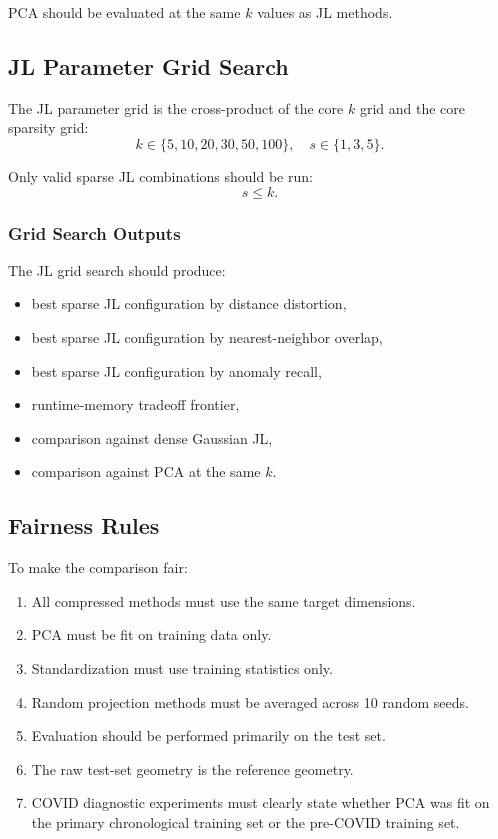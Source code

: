 \documentclass[11pt]{article}
\begin{document}
PCA should be evaluated at the same $k$ values as JL methods.

\subsection{JL Parameter Grid Search}

The JL parameter grid is the cross-product of the core $k$ grid and the core sparsity grid:
\[
k \in \{5, 10, 20, 30, 50, 100\},
\quad
s \in \{1, 3, 5\}.
\]

Only valid sparse JL combinations should be run:
\[
s \leq k.
\]

\subsubsection{Grid Search Outputs}

The JL grid search should produce:

\begin{itemize}
    \item best sparse JL configuration by distance distortion,
    \item best sparse JL configuration by nearest-neighbor overlap,
    \item best sparse JL configuration by anomaly recall,
    \item runtime-memory tradeoff frontier,
    \item comparison against dense Gaussian JL,
    \item comparison against PCA at the same $k$.
\end{itemize}

\subsection{Fairness Rules}

To make the comparison fair:

\begin{enumerate}
    \item All compressed methods must use the same target dimensions.
    \item PCA must be fit on training data only.
    \item Standardization must use training statistics only.
    \item Random projection methods must be averaged across 10 random seeds.
    \item Evaluation should be performed primarily on the test set.
    \item The raw test-set geometry is the reference geometry.
    \item COVID diagnostic experiments must clearly state whether PCA was fit on the primary chronological training set or the pre-COVID training set.
\end{enumerate}
\end{document}
